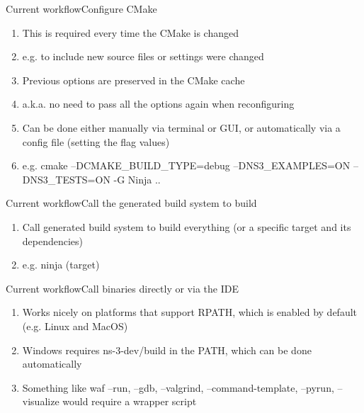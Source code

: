 \documentclass[12pt]{beamer}
\begin{document}
\begin{frame}{Current workflow}{Configure CMake}
    \begin{enumerate}
        \item This is required every time the CMake is changed
        \item[] \hspace{1em} {\footnotesize e.g. to include new source files or settings were changed}
        \item Previous options are preserved in the CMake cache
        \item[] \hspace{1em} {\footnotesize a.k.a. no need to pass all the options again when reconfiguring}
        \item Can be done either manually via terminal or GUI, or automatically via a config file (setting the flag values)
        \item[] {\footnotesize e.g. cmake --DCMAKE\_BUILD\_TYPE=debug --DNS3\_EXAMPLES=ON --DNS3\_TESTS=ON -G Ninja ..}
    \end{enumerate}
\end{frame}  

\begin{frame}{Current workflow}{Call the generated build system to build}
    \begin{enumerate}
        \item Call generated build system to build everything (or a specific target and its dependencies)
        \item[] {\footnotesize e.g. ninja (target)}

        
    \end{enumerate}
\end{frame}  

\begin{frame}{Current workflow}{Call binaries directly or via the IDE}
    \begin{enumerate}
        \item Works nicely on platforms that support RPATH, which is enabled by default (e.g. Linux and MacOS)
        \item Windows requires ns-3-dev/build in the PATH, which can be done automatically
        \item Something like waf --run, --gdb, --valgrind, --command-template, --pyrun, --visualize would require a wrapper script
    \end{enumerate}
\end{frame}  
\end{document}
